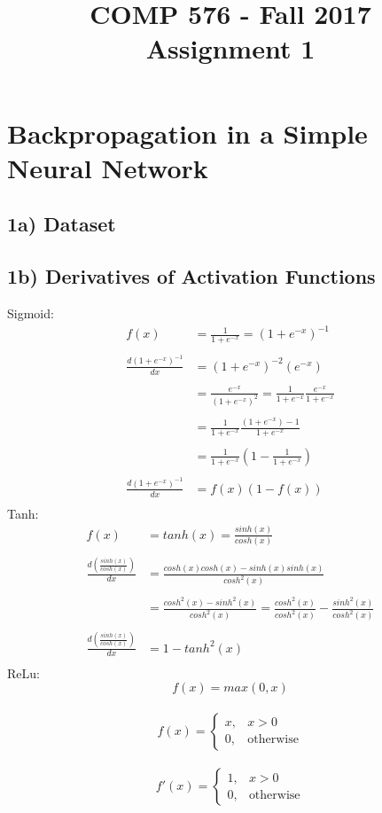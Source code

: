 \documentclass{article}
\title{COMP 576 - Fall 2017\\ Assignment 1}
\begin{document}
\maketitle
{}

\section*{Backpropagation in a Simple Neural Network}

\subsection*{1a) Dataset}

\subsection*{1b) Derivatives of Activation Functions}
Sigmoid: 
	\begin{align*}
		f(x) &= \frac{1}{1+e^{-x}} = (1+e^{-x})^{-1}\\ \\
		\frac{d(1+e^{-x})^{-1}}{dx} &= (1+e^{-x})^{-2} (e^{-x})\\\\
		&=\frac{e^{-x}}{(1+e^{-x})^{2}} = \frac{1}{1+e^{-x}}\frac{e^{-x}}{1+e^{-x}}\\\\
		&=\frac{1}{1+e^{-x}}\frac{(1+e^{-x}) - 1}{1+e^{-x}}\\\\
		&= \frac{1}{1+e^{-x}}\left (1 - \frac{ 1}{1+e^{-x}}\right)\\\\
		\frac{d(1+e^{-x})^{-1}}{dx} &= f(x)(1-f(x))\\
	\end{align*}
Tanh:
	\begin{align*}
		f(x) &= tanh(x) = \frac{sinh(x)}{cosh(x)}\\ \\
		\frac{d\left(\frac{sinh(x)}{cosh(x)}\right)}{dx}&= \frac{cosh(x)cosh(x) - sinh(x)sinh(x)}{cosh^{2}(x)}\\\\
		&= \frac{cosh^{2}(x)-sinh^{2}(x)}{cosh^{2}(x)} = \frac{cosh^{2}(x)}{cosh^{2}(x)} -  \frac{sinh^{2}(x)}{cosh^{2}(x)}\\\\
		\frac{d\left(\frac{sinh(x)}{cosh(x)}\right)}{dx}&=1-tanh^{2}(x)\\
	\end{align*}
ReLu:
	\begin{equation*}
		f(x) = max(0,x)
	\end{equation*}
\\
	\[
		f(x) = 
			\begin{cases}
				x, & x> 0\\
				0, & \text {otherwise}
			\end{cases}
	\]
\\
	\[
		f'(x) = 
			\begin{cases}
				1, & x> 0\\
				0, & \text {otherwise}
			\end{cases}
	\]
\end{document}
